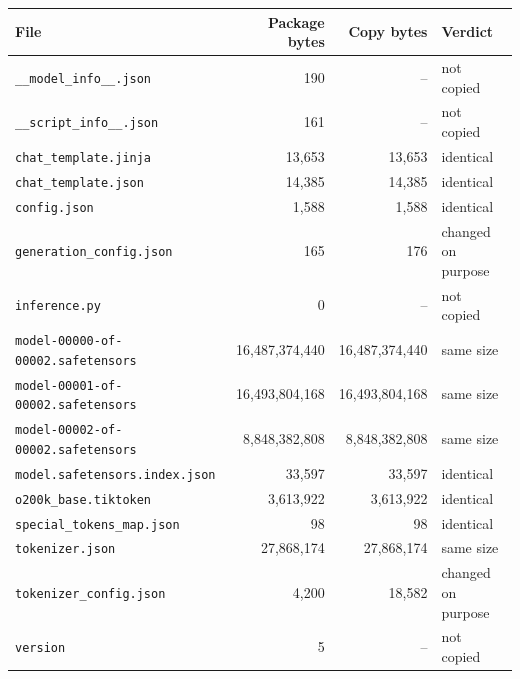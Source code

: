 \documentclass[11pt]{article}
\begin{document}
{\small
\begin{center}
\begin{minipage}{\linewidth}\centering
{}
\begin{tabular}{P{5.6cm}rrl}
\toprule
\textbf{File} & \textbf{Package bytes} & \textbf{Copy bytes} & \textbf{Verdict} \\
\midrule
\texttt{\_\_model\_info\_\_.json} & 190 & -- & not copied \\
\texttt{\_\_script\_info\_\_.json} & 161 & -- & not copied \\
\texttt{chat\_template.jinja} & 13,653 & 13,653 & identical \\
\texttt{chat\_template.json} & 14,385 & 14,385 & identical \\
\texttt{config.json} & 1,588 & 1,588 & identical \\
\texttt{generation\_config.json} & 165 & 176 & changed on purpose \\
\texttt{inference.py} & 0 & -- & not copied \\
\texttt{model-00000-of-00002.safetensors} & 16,487,374,440 & 16,487,374,440 & same size \\
\texttt{model-00001-of-00002.safetensors} & 16,493,804,168 & 16,493,804,168 & same size \\
\texttt{model-00002-of-00002.safetensors} & 8,848,382,808 & 8,848,382,808 & same size \\
\texttt{model.safetensors.index.json} & 33,597 & 33,597 & identical \\
\texttt{o200k\_base.tiktoken} & 3,613,922 & 3,613,922 & identical \\
\texttt{special\_tokens\_map.json} & 98 & 98 & identical \\
\texttt{tokenizer.json} & 27,868,174 & 27,868,174 & same size \\
\texttt{tokenizer\_config.json} & 4,200 & 18,582 & changed on purpose \\
\texttt{version} & 5 & -- & not copied \\
\bottomrule
\end{tabular}
\end{minipage}
\end{center}
}
\end{document}
